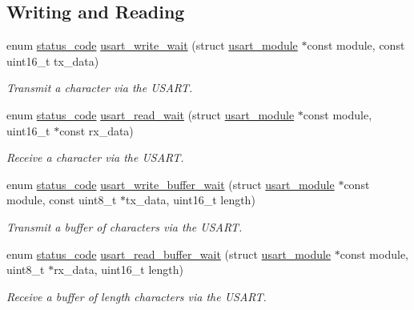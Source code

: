 \subsection*{Writing and Reading}
\begin{DoxyCompactItemize}
\item 
enum \mbox{\hyperlink{group__group__sam0__utils__status__codes_ga751c892e5a46b8e7d282085a5a5bf151}{status\+\_\+code}} \mbox{\hyperlink{group__asfdoc__sam0__sercom__usart__group_gaee8b142e8ad13e1e226334a9954e853c}{usart\+\_\+write\+\_\+wait}} (struct \mbox{\hyperlink{structusart__module}{usart\+\_\+module}} $\ast$const module, const uint16\+\_\+t tx\+\_\+data)
\begin{DoxyCompactList}\small\item\em Transmit a character via the U\+S\+A\+RT. \end{DoxyCompactList}\item 
enum \mbox{\hyperlink{group__group__sam0__utils__status__codes_ga751c892e5a46b8e7d282085a5a5bf151}{status\+\_\+code}} \mbox{\hyperlink{group__asfdoc__sam0__sercom__usart__group_gaf7db90c51a6f17edff5f1de2a0e3d8a5}{usart\+\_\+read\+\_\+wait}} (struct \mbox{\hyperlink{structusart__module}{usart\+\_\+module}} $\ast$const module, uint16\+\_\+t $\ast$const rx\+\_\+data)
\begin{DoxyCompactList}\small\item\em Receive a character via the U\+S\+A\+RT. \end{DoxyCompactList}\item 
enum \mbox{\hyperlink{group__group__sam0__utils__status__codes_ga751c892e5a46b8e7d282085a5a5bf151}{status\+\_\+code}} \mbox{\hyperlink{group__asfdoc__sam0__sercom__usart__group_gacffd0845249348d37d14c65a41132e41}{usart\+\_\+write\+\_\+buffer\+\_\+wait}} (struct \mbox{\hyperlink{structusart__module}{usart\+\_\+module}} $\ast$const module, const uint8\+\_\+t $\ast$tx\+\_\+data, uint16\+\_\+t length)
\begin{DoxyCompactList}\small\item\em Transmit a buffer of characters via the U\+S\+A\+RT. \end{DoxyCompactList}\item 
enum \mbox{\hyperlink{group__group__sam0__utils__status__codes_ga751c892e5a46b8e7d282085a5a5bf151}{status\+\_\+code}} \mbox{\hyperlink{group__asfdoc__sam0__sercom__usart__group_ga4f788b3478e9c1fa8f0dd8d09939d3a6}{usart\+\_\+read\+\_\+buffer\+\_\+wait}} (struct \mbox{\hyperlink{structusart__module}{usart\+\_\+module}} $\ast$const module, uint8\+\_\+t $\ast$rx\+\_\+data, uint16\+\_\+t length)
\begin{DoxyCompactList}\small\item\em Receive a buffer of {\ttfamily length} characters via the U\+S\+A\+RT. \end{DoxyCompactList}\end{DoxyCompactItemize}
